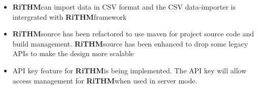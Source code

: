\documentclass[]{article}
\newcommand{\rithm}{\textbf{RiTHM}\space}
\begin{document}
\begin{itemize}
\item \rithm can import data in CSV format and the CSV data-importer is intergrated with \rithm framework

\item
\rithm source has been refactored to use maven for project source code and build management. \rithm source has been enhanced to drop some legacy APIs to make the design more scalable

\item API key feature for \rithm is being implemented. The API key will allow access management for \rithm when used in server mode.
\end{itemize}
\end{document}
